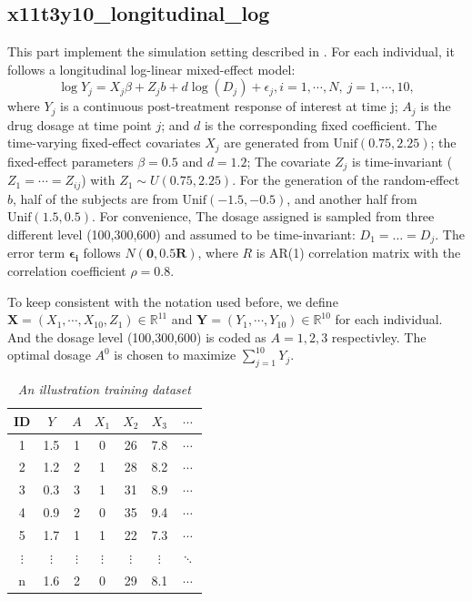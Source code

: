 \documentclass[12pt]{article}
\renewcommand{\vec}{\bm}
\begin{document}
\subsection*{x11t3y10\_longitudinal\_log}
This part implement the simulation setting described in \cite{zhu2016individualizing}. For each individual, it follows a longitudinal log-linear mixed-effect model:
\begin{equation}
\log Y_{j} = X_{j}\beta + Z_{j}b + d\log(D_j) +\epsilon_{j}, i=1,\cdots,N,~j=1,\cdots,10,
\end{equation}
where $Y_{j}$ is a continuous post-treatment response of interest at time j; $A_j$ is the drug dosage at time point $j$; and $d$ is the corresponding fixed coefficient. The time-varying fixed-effect covariates $X_{j}$ are generated from $\text{Unif}(0.75,2.25)$; the fixed-effect parameters  $\beta=0.5$ and $d=1.2$; The covariate $Z_{j}$ is time-invariant ($Z_{1}=\cdots=Z_{ij}$) with $Z_{1}\sim U(0.75,2.25)$. For the generation of the random-effect $b$, half of the subjects are from $\text{Unif}(-1.5,-0.5)$, and another half from $\text{Unif}(1.5,0.5)$. For convenience, The dosage assigned is sampled from three different level (100,300,600) and assumed to be time-invariant: $D_{1}=\dots=D_{j}$. The error term $\vec{\epsilon_i}$ follows $N(\vec{0}, 0.5\vec{R})$, where $R$ is AR(1) correlation matrix with the correlation coefficient $\rho=0.8$.

To keep consistent with the notation used before, we define $\vec{X}=(X_1,\cdots, X_{10},Z_1) \in \mathbb{R}^{11}$ and $\vec{Y}=(Y_1, \cdots,Y_10)\in \mathbb{R}^{10}$ for each individual. And the dosage level (100,300,600) is coded as $A=1,2,3$ respectivley. The optimal dosage  $A^0$ is chosen to maximize $\sum_{j=1}^{10} Y_j$.




\newpage

\begin{table}[htbp]
  \centering
  \caption{\emph{An illustration training dataset}}
    \begin{tabular}{c|c|c|cccc}
    \hline
    \hline
    ID & $Y$     & $A$   & $X_1$    & $X_2$    & $X_3$    & $\cdots$ \\
    \hline
    1&1.5  & 1     & 0     & 26    & 7.8   & $\cdots$ \\
    2&1.2  & 2     & 1     & 28    & 8.2   & $\cdots$  \\
    3&0.3  & 3     & 1     & 31    & 8.9   & $\cdots$  \\
    4&0.9  & 2     & 0     & 35    & 9.4   & $\cdots$  \\
    5&1.7  & 1     & 1     & 22    & 7.3   & $\cdots$  \\
    $\vdots$ & $\vdots$    & $\vdots$    & $\vdots$   & $\vdots$     & $\vdots$     & $\ddots$  \\
    n & 1.6 & 2 & 0 & 29 & 8.1 & $\cdots$ \\
    \hline
    \hline
    \end{tabular}%
  \label{tab:TrainingDataExample}%
\end{table}%
\end{document}
